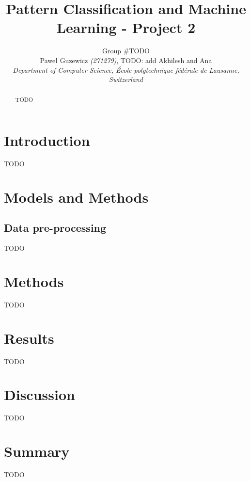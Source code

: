 \documentclass[10pt,conference,compsocconf]{IEEEtran}
\begin{document}
\title{Pattern Classification and Machine Learning - Project 2}

\author{
  Group \#TODO\\
  Paweł Guzewicz \textit{(271279)}, TODO: add Akhilesh and Ana\\
  \textit{Department of Computer Science, École polytechnique fédérale de Lausanne, Switzerland}
}

\maketitle

\begin{abstract}
  TODO
\end{abstract}

\section{Introduction}
  TODO

\section{Models and Methods}

\subsection{Data pre-processing}
  TODO

\section{Methods}
  TODO

\section{Results}
  TODO

\section{Discussion}
  TODO

\section{Summary}
  TODO



\end{document}
